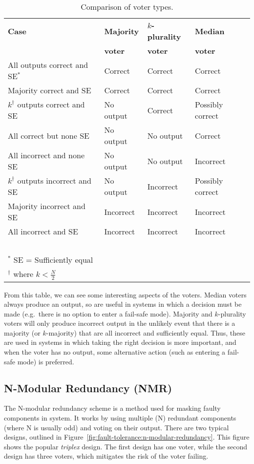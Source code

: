 \begin{table}[!h]
\centering
\begin{tabular}{llll}
\toprule
{\bf Case} & {\bf Majority} & {\bf \(k\)-plurality} &
             {\bf Median}\\
  & {\bf voter} & {\bf voter} &{\bf voter}\\
\midrule
All outputs correct and SE\(^*\) & Correct & Correct & Correct\\
Majority correct and SE & Correct & Correct & Correct\\
\(k^{\dagger}\) outputs correct and SE 
         & No output & Correct & Possibly correct\\[3mm]
All correct but none SE & No output & No output & Correct\\
All incorrect and none SE & No output & No output & Incorrect\\
\(k^{\dagger}\) outputs incorrect and SE & No output & Incorrect & Possibly correct\\[3mm]
Majority incorrect and SE & Incorrect & Incorrect & Incorrect\\
All incorrect and SE & Incorrect & Incorrect & Incorrect\\
\bottomrule
~\\
\(^*\) SE = Sufficiently equal\\
\(^{\dagger}\) where \(k < \frac{N}{2}\)
\end{tabular}
\caption{Comparison of voter types.}
\label{tab:fault-tolerance:voter-comparison}
\end{table}

From this table, we can see some interesting aspects of the voters. Median voters always produce an output, so are useful in systems in which a decision must be made (e.g.\ there is no option to enter a fail-safe mode). Majority and \(k\)-plurality voters will only produce incorrect output in the unlikely event that there is a majority (or \(k\)-majority) that are all incorrect and sufficiently equal. Thus, these are used in systems in which taking the right decision is more important, and when the voter has no output, some alternative action (such as entering a fail-safe mode) is preferred.

\subsection{N-Modular Redundancy (NMR)}

The N-modular redundancy scheme is a method used for masking faulty components in  system.  It works by using multiple (N) redundant components (where N is usually odd) and voting on their output. There are two typical designs, outlined in Figure~\ref{fig:fault-tolerance:n-modular-redundancy}. This figure shows the popular \emph{triplex} design. The first design has one voter, while the second design has three voters, which mitigates the risk of the voter failing.


